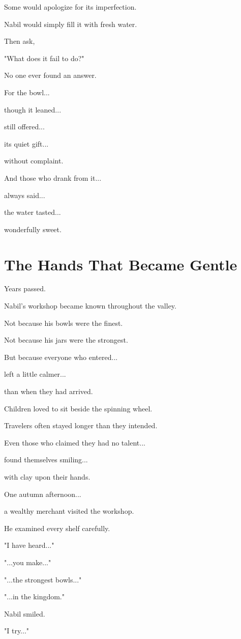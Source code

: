 \documentclass[12pt,openany]{book}
\begin{document}
Some would apologize for its imperfection.

Nabil would simply fill it with fresh water.

Then ask,

"What does it fail to do?"

No one ever found an answer.

For the bowl...

though it leaned...

still offered...

its quiet gift...

without complaint.

And those who drank from it...

always said...

the water tasted...

wonderfully sweet.
\section*{The Hands That Became Gentle}

Years passed.

Nabil's workshop became known throughout the valley.

Not because his bowls were the finest.

Not because his jars were the strongest.

But because everyone who entered...

left a little calmer...

than when they had arrived.

Children loved to sit beside the spinning wheel.

Travelers often stayed longer than they intended.

Even those who claimed they had no talent...

found themselves smiling...

with clay upon their hands.

One autumn afternoon...

a wealthy merchant visited the workshop.

He examined every shelf carefully.

"I have heard..."

"...you make..."

"...the strongest bowls..."

"...in the kingdom."

Nabil smiled.

"I try..."
\end{document}
